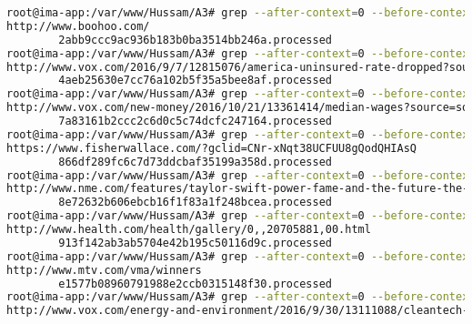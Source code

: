 \documentclass[a4paper, 11pt]{article}
\begin{document}
\begin{lstlisting}[language=bash, breakatwhitespace=〈false), label=Matching file names to URIs, caption= Matching file names to URIs:]
root@ima-app:/var/www/Hussam/A3# grep --after-context=0 --before-context=1 "2abb9ccc9ac936b183b0ba3514bb246a.processed" map.txt
http://www.boohoo.com/
        2abb9ccc9ac936b183b0ba3514bb246a.processed
root@ima-app:/var/www/Hussam/A3# grep --after-context=0 --before-context=1 "4aeb25630e7cc76a102b5f35a5bee8af.processed" map.txt
http://www.vox.com/2016/9/7/12815076/america-uninsured-rate-dropped?source=socnet_tw_aca_20160907_bo_uninsured-rate-low_vox_3&utm_medium=social&utm_source=tw_bo&utm_campaign=socnet_tw_aca_20160907_bo_uninsured-rate-low_vox_3&utm_content=20160907_bo_uninsured-rate-low_vox_3
        4aeb25630e7cc76a102b5f35a5bee8af.processed
root@ima-app:/var/www/Hussam/A3# grep --after-context=0 --before-context=1 "7a83161b2ccc2c6d0c5c74dcfc247164.processed" map.txt
http://www.vox.com/new-money/2016/10/21/13361414/median-wages?source=socnet_tw_econ_20161026_bo_wage-increase_durable_4&utm_medium=social&utm_source=tw_bo&utm_campaign=socnet_tw_econ_20161026_bo_wage-increase_durable_4&utm_content=20161026_bo_wage-increase_durable_4
        7a83161b2ccc2c6d0c5c74dcfc247164.processed
root@ima-app:/var/www/Hussam/A3# grep --after-context=0 --before-context=1 "866df289fc6c7d73ddcbaf35199a358d.processed" map.txt
https://www.fisherwallace.com/?gclid=CNr-xNqt38UCFUU8gQodQHIAsQ
        866df289fc6c7d73ddcbaf35199a358d.processed
root@ima-app:/var/www/Hussam/A3# grep --after-context=0 --before-context=1 "8e72632b606ebcb16f1f83a1f248bcea.processed" map.txt
http://www.nme.com/features/taylor-swift-power-fame-and-the-future-the-full-nme-cover-interview-549
        8e72632b606ebcb16f1f83a1f248bcea.processed
root@ima-app:/var/www/Hussam/A3# grep --after-context=0 --before-context=1 "913f142ab3ab5704e42b195c50116d9c.processed" map.txt
http://www.health.com/health/gallery/0,,20705881,00.html
        913f142ab3ab5704e42b195c50116d9c.processed
root@ima-app:/var/www/Hussam/A3# grep --after-context=0 --before-context=1 "e1577b08960791988e2ccb0315148f30.processed" map.txt
http://www.mtv.com/vma/winners
        e1577b08960791988e2ccb0315148f30.processed
root@ima-app:/var/www/Hussam/A3# grep --after-context=0 --before-context=1 "f158b3a1dabb47a8a42fe06cd86444c0.processed" map.txt
http://www.vox.com/energy-and-environment/2016/9/30/13111088/cleantech-costs-falling-one-chart?source=socnet_tw_cc_20161006_bo_clean-energy_technology_1&utm_medium=social&utm_source=tw_bo&utm_campaign=socnet_tw_cc_20161006_bo_clean-energy_technology_1&utm_content=20161006_bo_clean-energy_technology_1

\end{lstlisting}
\end{document}
